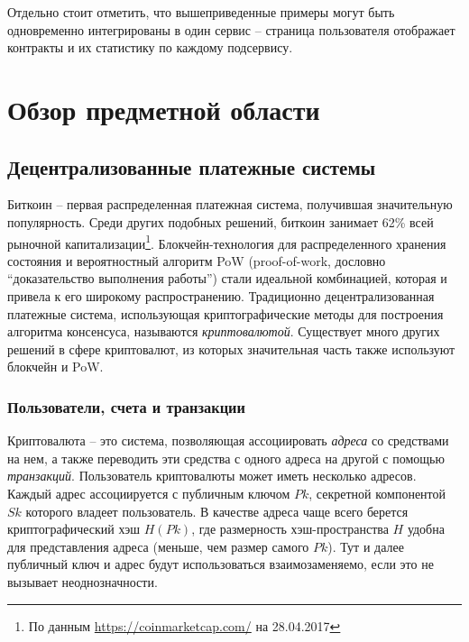 \documentclass[specification,annotation]{itmo-student-thesis}
\begin{document}
Отдельно стоит отметить, что вышеприведенные примеры могут быть
одновременно интегрированы в один сервис -- страница пользователя
отображает контракты и их статистику по каждому подсервису.

\chapter{Обзор предметной области}

\section{Децентрализованные платежные системы}

Биткоин -- первая распределенная платежная система, получившая
значительную популярность. Среди других подобных решений, биткоин
занимает 62\% всей рыночной капитализации\footnote{По данным
  \url{https://coinmarketcap.com/} на 28.04.2017}. Блокчейн-технология
для распределенного хранения состояния и вероятностный алгоритм PoW
(proof-of-work, дословно ``доказательство выполнения работы'') стали
идеальной комбинацией, которая и привела к его широкому
распространению. Традиционно децентрализованная платежные система,
использующая криптографические методы для построения алгоритма
консенсуса, называются {\it криптовалютой}. Существует много других
решений в сфере криптовалют, из которых значительная часть также
используют блокчейн и PoW.

\subsection{Пользователи, счета и транзакции}

Криптовалюта -- это система, позволяющая ассоциировать {\it адреса} со
средствами на нем, а также переводить эти средства с одного адреса на
другой с помощью {\it транзакций}. Пользователь криптовалюты может
иметь несколько адресов. Каждый адрес ассоциируется с публичным ключом
$Pk$, секретной компонентой $Sk$ которого владеет пользователь. В
качестве адреса чаще всего берется криптографический хэш $H(Pk)$, где
размерность хэш-пространства $H$ удобна для представления адреса
(меньше, чем размер самого $Pk$). Тут и далее публичный ключ и адрес
будут использоваться взаимозаменяемо, если это не вызывает
неоднозначности.
\end{document}
